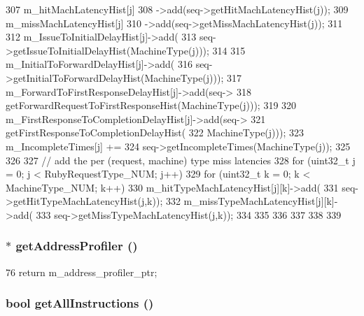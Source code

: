 \begin{DoxyCode}
{{{{{307                     m_hitMachLatencyHist[j]
308                         ->add(seq->getHitMachLatencyHist(j));
309                     m_missMachLatencyHist[j]
310                         ->add(seq->getMissMachLatencyHist(j));
311 
312                     m_IssueToInitialDelayHist[j]->add(
313                         seq->getIssueToInitialDelayHist(MachineType(j)));
314 
315                     m_InitialToForwardDelayHist[j]->add(
316                         seq->getInitialToForwardDelayHist(MachineType(j)));
317                     m_ForwardToFirstResponseDelayHist[j]->add(seq->
318                         getForwardRequestToFirstResponseHist(MachineType(j)));
319 
320                     m_FirstResponseToCompletionDelayHist[j]->add(seq->
321                         getFirstResponseToCompletionDelayHist(
322                             MachineType(j)));
323                     m_IncompleteTimes[j] +=
324                         seq->getIncompleteTimes(MachineType(j));
325                 }
326 
327                 // add the per (request, machine) type miss latencies
328                 for (uint32_t j = 0; j < RubyRequestType_NUM; j++) {
329                     for (uint32_t k = 0; k < MachineType_NUM; k++) {
330                         m_hitTypeMachLatencyHist[j][k]->add(
331                                 seq->getHitTypeMachLatencyHist(j,k));
332                         m_missTypeMachLatencyHist[j][k]->add(
333                                 seq->getMissTypeMachLatencyHist(j,k));
334                     }
335                 }
336             }
337         }
338     }
339 }
\end{DoxyCode}
\hypertarget{classProfiler_a380304db5e7667dff1ac27da6e26a220}{
\subsubsection[{getAddressProfiler}]{$\ast$ getAddressProfiler ()}}
\label{classProfiler_a380304db5e7667dff1ac27da6e26a220}



\begin{DoxyCode}
76 { return m_address_profiler_ptr; }
\end{DoxyCode}
\hypertarget{classProfiler_a2468f3f3e9df68e9adff81a531e78795}{
\subsubsection[{getAllInstructions}]{\setlength{\rightskip}{0pt plus 5cm}bool getAllInstructions ()}}
\label{classProfiler_a2468f3f3e9df68e9adff81a531e78795}



